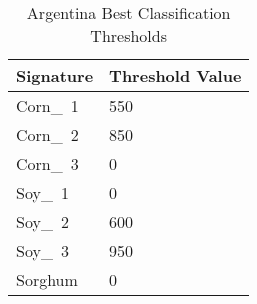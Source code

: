 \begin{Spacing}{1.0}
\begin{table}
  \centering
  \caption{Argentina Best Classification Thresholds}
  \label{table:ARbestthresh}
  \begin{tabu} to 4in {ZZ}
    \toprule
    \textbf{Signature} & \textbf{Threshold Value} \\
    \midrule
    Corn\_~1 & 550 \\
    Corn\_~2 & 850 \\
    Corn\_~3 & 0 \\
    Soy\_~1 & 0 \\
    Soy\_~2 & 600 \\
    Soy\_~3 & 950 \\
    Sorghum & 0 \\
    \bottomrule
  \end{tabu}
\end{table}
\end{Spacing}

















